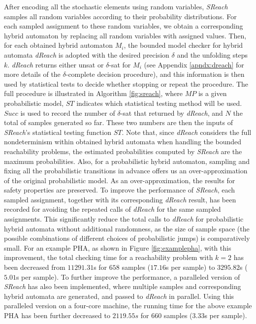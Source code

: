 After encoding all the stochastic elements using random variables, {\it SReach} samples all random variables according to their probability distributions. For each sampled assignment to these random variables, we obtain a corresponding hybrid automaton by replacing all random variables with assigned values. Then, for each obtained hybrid automaton $M_i$, the bounded model checker for hybrid automata {\it dReach} \cite{gaodelta} is adopted with the desired precision $\delta$ and the unfolding steps $k$. {\it dReach} returns either unsat or $\delta$-sat for $M_i$ (see Appendix \ref{apndx:dreach} for more details of the $\delta$-complete decision procedure), and this information
is then used by statistical tests to decide whether stopping or repeat the procedure. The full procedure is illustrated in Algorithm \ref{fig:sreach}, where $MP$ is a given probabilistic model, $ST$ indicates which statistical testing method will be used. $Succ$ is used to record the number of $\delta$-sat that returned by {\it dReach}, and $N$ the total of samples generated so far. These two numbers are then the inputs of {\it SReach}'s statistical testing function $ST$. Note that, since {\it dReach} considers the full nondeterminism within obtained hybrid automata when handling the bounded reachability problems, the estimated probabilities computed by {\it SReach} are the maximum probabilities. Also, for a probabilistic hybrid automaton, sampling and fixing all the probabilistic transitions in advance offers us an over-approximation of the original probabilistic model. As an over-approximation, the results for safety properties are preserved. To improve the performance of {\it SReach}, each sampled assignment, together with its corresponding {\it dReach} result, has been recorded for avoiding the repeated calls of {\it dReach} for the same sampled assignments. This significantly reduce the total calls to {\it dReach} for probabilistic hybrid automata without additional randomness, as the size of sample space (the possible combinations of different choices of probabilistic jumps) is comparatively small. For an example PHA, as shown in Figure \ref{fig:examplepha}, with this improvement, the total checking time for a reachability problem with $k=2$ has been decreased from $11291.31$s for $658$ samples ($17.16$s per sample) to $3295.82$s ($5.01$s per sample). To further improve the performance, a paralleled version of {\it SReach} has also been implemented, where multiple samples and corresponding hybrid automata are generated, and passed to {\it dReach} in parallel. Using this paralleled version on a four-core machine, the running time for the above example PHA has been further decreased to $2119.55s$ for $660$ samples ($3.33$s per sample). 

